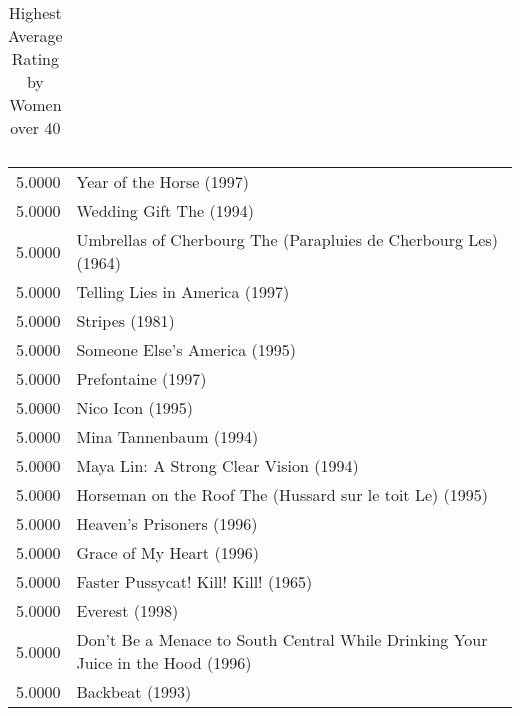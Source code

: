 \begin{flushleft}
\begin{table}[h]
\begin{tabular}{|ll|}
\end{tabular}
\caption{Highest Average Rating by Women over 40}
\end{table}



\begin{table}[h]
\centering
\setlength{\tabcolsep}{12pt}
\begin{tabular}{|ll|}
\hline
5.0000 & Year of the Horse (1997)                                                        \\
5.0000 & Wedding Gift The (1994)                                                         \\
5.0000 & Umbrellas of Cherbourg The (Parapluies de Cherbourg Les) (1964)                 \\
5.0000 & Telling Lies in America (1997)                                                  \\
5.0000 & Stripes (1981)                                                                  \\
5.0000 & Someone Else's America (1995)                                                   \\
5.0000 & Prefontaine (1997)                                                              \\
5.0000 & Nico Icon (1995)                                                                \\
5.0000 & Mina Tannenbaum (1994)                                                          \\
5.0000 & Maya Lin: A Strong Clear Vision (1994)                                          \\
5.0000 & Horseman on the Roof The (Hussard sur le toit Le) (1995)                        \\
5.0000 & Heaven's Prisoners (1996)                                                       \\
5.0000 & Grace of My Heart (1996)                                                        \\
5.0000 & Faster Pussycat! Kill! Kill! (1965)                                             \\
5.0000 & Everest (1998)                                                                  \\
5.0000 & Don't Be a Menace to South Central While Drinking Your Juice in the Hood (1996) \\
5.0000 & Backbeat (1993)                                                                 \\ \hline

\end{tabular}
\end{table}
\end{flushleft}
